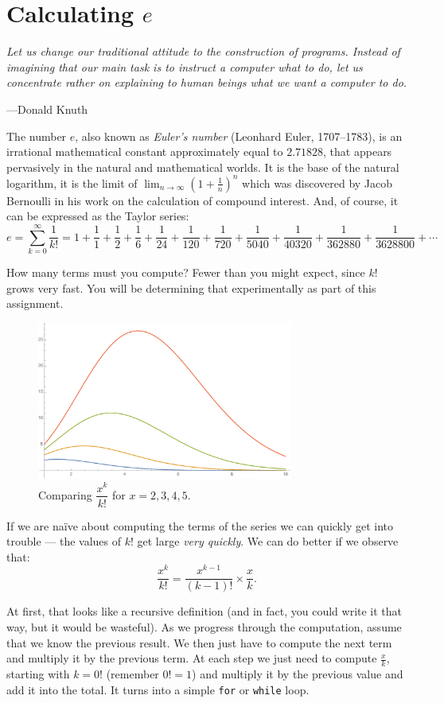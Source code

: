 \section{Calculating $e$}

\textwidth
\epigraph{\emph{Let us change our traditional attitude to the
    construction of programs. Instead of imagining that our main task is
    to instruct a computer what to do, let us concentrate rather on
    explaining to human beings what we want a computer to do.}}
    {---Donald Knuth}

\noindent
The number $e$, also known as \emph{Euler's number} (Leonhard Euler,
1707--1783), is an irrational mathematical constant approximately
equal to $2.71828$, that appears pervasively in the natural and
mathematical worlds. It is the base of the natural logarithm, it
is the limit of $\lim_{n\rightarrow\infty} (1 + \frac{1}{n})^n$
which was discovered by Jacob Bernoulli in his work on the calculation
of compound interest. And, of course, it can be expressed as the
Taylor series: $$ e=\sum_{k=0}^\infty \frac{1}{k!} =
1+\frac{1}{1}+\frac{1}{2}+\frac{1}{6}+\frac{1}{24}+\frac{1}{120}+\frac{1}{720}+\frac{1}
{5040}+\frac{1}{40320}+\frac{1}{362880}+\frac{1}{3628800}+\cdots
$$

How many terms must you compute? Fewer than you might expect, since $k!$
grows very fast. You will be determining that experimentally as part of this assignment.

\begin{figure}[bth]
\begin{centering}
\includegraphics[width=0.75\textwidth]{images/growth.pdf}
\caption{Comparing $\dfrac{x^k}{k!}$ for $x=2,3,4,5$.}\label{growth}
\end{centering}
\end{figure}

If we are na\"ive about computing the terms of the series we can quickly
get into trouble --- the values of $k!$ get large \emph{very quickly}.
We can do better if we observe that:
$$
\frac{x^k}{k!} = \frac{x^{k-1}}{(k-1)!} \times \frac{x}{k} .
$$

At first, that looks like a recursive definition (and in fact, you could
write it that way, but it would be wasteful). As we progress through the
computation, assume that we know the previous result. We then just have
to compute the next term and multiply it by the previous term. At each
step we just need to compute $\frac{x}{k}$, starting with $k = 0!$
(remember $0! = 1$) and multiply it by the previous value and add it
into the total. It turns into a simple \texttt{for} or \texttt{while}
loop.
